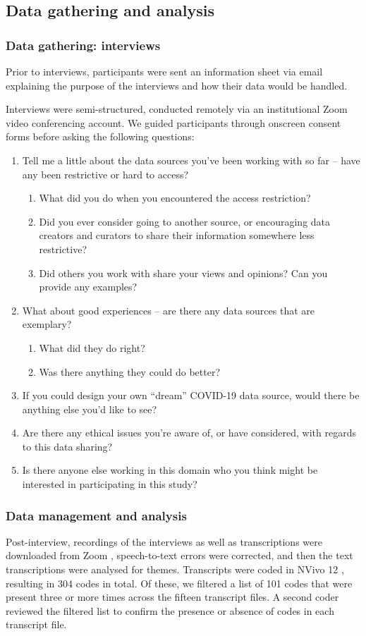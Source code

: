 \documentclass{CUP-JNL-DAP}%
\begin{document}
\subsection{Data gathering and analysis}

\subsubsection{Data gathering: interviews}
Prior to interviews, participants were sent an information sheet via email explaining the purpose of the interviews and how their data would be handled. 

Interviews were semi-structured, conducted remotely via an institutional Zoom video conferencing account. We guided participants through onscreen consent forms  before asking the following questions: 

\begin{enumerate}
\item Tell me a little about the data sources you've been working with so far – have any been restrictive or hard to access?
\begin{enumerate}
\item What did you do when you encountered the access restriction?
\item Did you ever consider going to another source, or encouraging data creators and curators to share their information somewhere less restrictive?
\item Did others you work with share your views and opinions? Can you provide any examples?
\end{enumerate}
\item What about good experiences – are there any data sources that are exemplary? 
\begin{enumerate}
\item What did they do right?
\item Was there anything they could do better?
\end{enumerate}
\item If you could design your own “dream” COVID-19 data source, would there be anything
else you’d like to see?
\item Are there any ethical issues you’re aware of, or have considered, with regards to this
data sharing?
\item Is there anyone else working in this domain who you think might be interested in
participating in this study?
\end{enumerate}

\subsubsection{Data management and analysis}
Post-interview, recordings of the interviews as well as transcriptions were downloaded from Zoom \cite{zoom_2022}, speech-to-text errors were corrected, and then the text transcriptions were analysed for themes. Transcripts were coded in NVivo 12 \cite{qsr_international_pty_ltd_nvivo_2018}, resulting in 304 codes in total. Of these, we filtered a list of 101 codes that were present three or more times across the fifteen transcript files. A second coder reviewed the filtered list to confirm the presence or absence of codes in each transcript file. 
\end{document}
